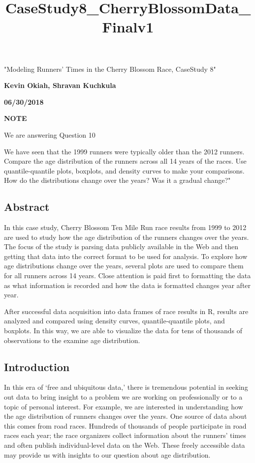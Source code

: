 \documentclass[11pt]{article}
\title{CaseStudy8\_CherryBlossomData\_Finalv1}
\begin{document}
    
    
    \maketitle
    
    

    
     "Modeling Runners' Times in the Cherry Blossom Race, CaseStudy 8"

\textbf{Kevin Okiah, Shravan Kuchkula}

\textbf{06/30/2018}

    \textbf{NOTE}

We are answering Question 10

We have seen that the 1999 runners were typically older than the 2012
runners. Compare the age distribution of the runners across all 14 years
of the races. Use quantile-quantile plots, boxplots, and density curves
to make your comparisons. How do the distributions change over the
years? Was it a gradual change?"

    \subsection{Abstract}\label{abstract}

    In this case study, Cherry Blossom Ten Mile Run race results from 1999
to 2012 are used to study how the age distribution of the runners
changes over the years. The focus of the study is parsing data publicly
available in the Web and then getting that data into the correct format
to be used for analysis. To explore how age distributions change over
the years, several plots are used to compare them for all runners across
14 years. Close attention is paid first to formatting the data as what
information is recorded and how the data is formatted changes year after
year.

After successful data acquisition into data frames of race results in R,
results are analyzed and compared using density curves,
quantile-quantile plots, and boxplots. In this way, we are able to
visualize the data for tens of thousands of observations to the examine
age distribution.

    \subsection{Introduction}\label{introduction}

    In this era of `free and ubiquitous data,' there is tremendous potential
in seeking out data to bring insight to a problem we are working on
professionally or to a topic of personal interest. For example, we are
interested in understanding how the age distribution of runners changes
over the years. One source of data about this comes from road races.
Hundreds of thousands of people participate in road races each year; the
race organizers collect information about the runners' times and often
publish individual-level data on the Web. These freely accessible data
may provide us with insights to our question about age distribution.
\end{document}
